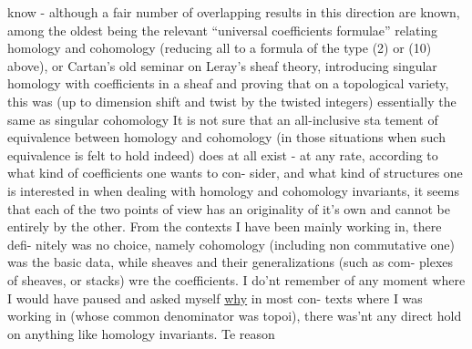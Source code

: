 
know -  although a fair number of  overlapping results in this direction
are known,  among the oldest being the relevant ``universal coefficients
formulae''  relating homology and cohomology (reducing all to a formula of
the type (2) or (10) above),  or Cartan's old seminar on  Leray's
sheaf theory,   introducing singular homology with coefficients
in a sheaf and proving that on a topological variety,  this was (up to
dimension shift and twist by the  twisted integers) essentially
the same as singular cohomology  It is not sure that an all-inclusive sta%
tement of equivalence between homology and cohomology (in those situations
when such equivalence is felt to hold indeed) does at all exist  - 
at any rate,  according to what kind of coefficients  one wants to con-%
sider,  and what kind of  structures one is interested in when dealing with
homology and cohomology invariants,  it seems that each of the two points
of view has an originality  of it's own and cannot be entirely   by
the other.  From the contexts I have been mainly working in,  there defi-%
nitely was no choice,  namely cohomology (including non commutative one)
was the basic data,  while sheaves and their generalizations (such as com-%
plexes of sheaves,  or stacks)  wre the coefficients.  I do'nt remember
of any moment where I would have paused and asked myself \uline{why} in most con-%
texts where I was working in (whose common denominator was topoi),  there
was'nt any direct hold on anything like homology invariants.  Te reason
